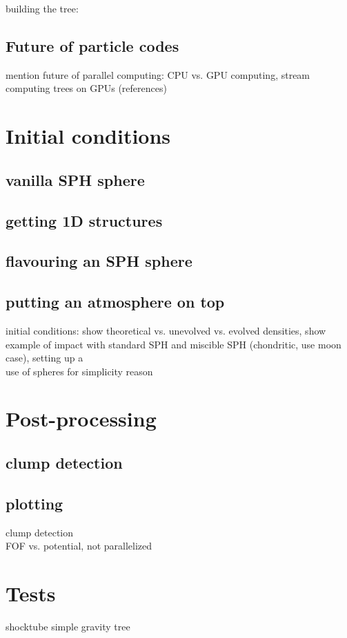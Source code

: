 building the tree:



\subsection{Future of particle codes}
mention future of parallel computing: CPU vs. GPU computing, stream computing
trees on GPUs (references)



\section{Initial conditions}
\subsection{vanilla SPH sphere}
\subsection{getting 1D structures}
\citep{Benz:1991p700}

\subsection{flavouring an SPH sphere}
\subsection{putting an atmosphere on top}
initial conditions: show theoretical vs. unevolved vs. evolved densities, show example of impact with standard SPH and miscible SPH (chondritic, use moon case), setting up a \SSC \\
use of spheres for simplicity reason


\section{Post-processing}
\subsection{clump detection}
\subsection{plotting}
clump detection\\
FOF vs. potential, not parallelized\\

\section{Tests}
shocktube
simple gravity tree

\citep{Abel:2010p3297}
\citep{Barnes:1986p2853}
\citep{bryant2010computer}
\citep{Melosh:2007p3502}
\citep{Monaghan:2005p2677}
\citep{Monaghan:1992ARAA..30..543M}
\citep{Ott:2003p3727}
\citep{Price:2004p2613}
\citep{Solenthaler:2008p3720}
\citep{Springel:2003p3298}
\citep{Springel:2005p51}







